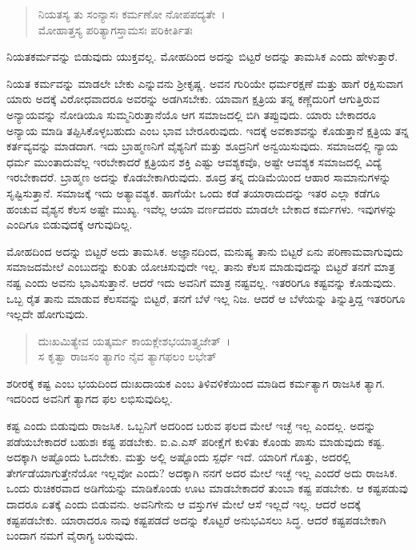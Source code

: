 \begin{verse}
ನಿಯತಸ್ಯ ತು ಸಂನ್ಯಾಸಃ ಕರ್ಮಣೋ ನೋಪಪದ್ಯತೇ~।\\ಮೋಹಾತ್ತಸ್ಯ ಪರಿತ್ಯಾಗಸ್ತಾಮಸಃ ಪರಿಕೀರ್ತಿತಃ 
\end{verse}

{\small ನಿಯತಕರ್ಮವನ್ನು ಬಿಡುವುದು ಯುಕ್ತವಲ್ಲ. ಮೋಹದಿಂದ ಅದನ್ನು ಬಿಟ್ಟರೆ ಅದನ್ನು ತಾಮಸಿಕ ಎಂದು ಹೇಳುತ್ತಾರೆ.}

ನಿಯತ ಕರ್ಮವನ್ನು ಮಾಡಲೇ ಬೇಕು ಎನ್ನುವನು ಶ‍್ರೀಕೃಷ್ಣ. ಅವನ ಗುರಿಯೇ ಧರ್ಮರಕ್ಷಣೆ ಮತ್ತು ಹಾಗೆ ರಕ್ಷಿಸುವಾಗ ಯಾರು ಅದಕ್ಕೆ ವಿರೋಧವಾದರೂ ಅವರನ್ನು ಅಡಗಿಸಬೇಕು. ಯಾವಾಗ ಕ್ಷತ್ರಿಯ ತನ್ನ ಕಣ್ಣೆದುರಿಗೆ ಆಗುತ್ತಿರುವ ಅನ್ಯಾಯವನ್ನು ನೋಡಿಯೂ ಸುಮ್ಮನಿರುತ್ತಾನೆಯೊ ಆಗ ಸಮಾಜದಲ್ಲಿ ಬಿಗಿ ತಪ್ಪುವುದು. ಯಾರು ಬೇಕಾದರೂ ಅನ್ಯಾಯ ಮಾಡಿ ತಪ್ಪಿಸಿಕೊಳ್ಳಬಹುದು ಎಂಬ ಭಾವ ಬೇರೂರುವುದು. ಇದಕ್ಕೆ ಅವಕಾಶವನ್ನು ಕೊಡುತ್ತಾನೆ ಕ್ಷತ್ರಿಯ ತನ್ನ ಕರ್ತವ್ಯವನ್ನು ಮಾಡದಾಗ. ಇದು ಬ್ರಾಹ್ಮಣನಿಗೆ ವೈಶ್ಯನಿಗೆ ಮತ್ತು ಶೂದ್ರನಿಗೆ ಅನ್ವಯಿಸುವುದು. ಸಮಾಜದಲ್ಲಿ ನ್ಯಾಯ ಧರ್ಮ ಮುಂತಾದುವೆಲ್ಲ ಇರಬೇಕಾದರೆ ಕ್ಷತ್ರಿಯನ ಶಕ್ತಿ ಎಷ್ಟು ಆವಶ್ಯಕವೊ, ಅಷ್ಟೇ ಆವಶ್ಯಕ ಸಮಾಜದಲ್ಲಿ ವಿದ್ಯೆ ಇರಬೇಕಾದರೆ. ಬ್ರಾಹ್ಮಣ ಅದನ್ನು ಕೊಡಬೇಕಾಗಿರುವುದು. ಶೂದ್ರ ತನ್ನ ದುಡಿಮೆಯಿಂದ ಆಹಾರ ಸಾಮಾನುಗಳನ್ನು ಸೃಷ್ಟಿಸುತ್ತಾನೆ. ಸಮಾಜಕ್ಕೆ ಇದು ಅತ್ಯಾವಶ್ಯಕ. ಹಾಗೆಯೇ ಒಂದು ಕಡೆ ತಯಾರಾದುದನ್ನು ಇತರ ಎಲ್ಲಾ ಕಡೆಗೂ ಹಂಚುವ ವೈಶ್ಯನ ಕೆಲಸ ಅಷ್ಟೇ ಮುಖ್ಯ. ಇವೆಲ್ಲ ಆಯಾ ವರ್ಣದವರು ಮಾಡಲೇ ಬೇಕಾದ ಕರ್ಮಗಳು. ಇವುಗಳನ್ನು ಎಂದಿಗೂ ಬಿಡುವುದಕ್ಕೆ ಆಗುವುದಿಲ್ಲ.

ಮೋಹದಿಂದ ಅದನ್ನು ಬಿಟ್ಟರೆ ಅದು ತಾಮಸಿಕ. ಅಜ್ಞಾನದಿಂದ, ಮನುಷ್ಯ ತಾನು ಬಿಟ್ಟರೆ ಏನು ಪರಿಣಾಮವಾಗುವುದು ಸಮಾಜದಮೇಲೆ ಎಂಬುದನ್ನು ಕುರಿತು ಯೋಚಿಸುವುದೇ ಇಲ್ಲ. ತಾನು ಕೆಲಸ ಮಾಡುವುದನ್ನು ಬಿಟ್ಟರೆ ತನಗೆ ಮಾತ್ರ ನಷ್ಟ ಎಂದು ಅವನು ಭಾವಿಸುತ್ತಾನೆ. ಆದರೆ ಇದು ಅವನಿಗೆ ಮಾತ್ರ ನಷ್ಟವಲ್ಲ. ಇತರರಿಗೂ ಕಷ್ಟವನ್ನು ಕೊಡುವುದು. ಒಬ್ಬ ರೈತ ತಾನು ಮಾಡುವ ಕೆಲಸವನ್ನು ಬಿಟ್ಟರೆ, ತನಗೆ ಬೆಳೆ ಇಲ್ಲ ನಿಜ. ಆದರೆ ಆ ಬೆಳೆಯನ್ನು ತಿನ್ನುತ್ತಿದ್ದ ಇತರರಿಗೂ ಇಲ್ಲದೇ ಹೋಗುವುದು.

\begin{verse}
ದುಃಖಮಿತ್ಯೇವ ಯತ್ಕರ್ಮ ಕಾಯಕ್ಲೇಶಭಯಾತ್ತ್ಯಜೇತ್~।\\ಸ ಕೃತ್ವಾ ರಾಜಸಂ ತ್ಯಾಗಂ ನೈವ ತ್ಯಾಗಫಲಂ ಲಭೇತ್ 
\end{verse}

{\small ಶರೀರಕ್ಕೆ ಕಷ್ಟ ಎಂಬ ಭಯದಿಂದ ದುಃಖದಾಯಕ ಎಂಬ ತಿಳಿವಳಿಕೆಯಿಂದ ಮಾಡಿದ ಕರ್ಮತ್ಯಾಗ ರಾಜಸಿಕ ತ್ಯಾಗ. ಇದರಿಂದ ಅವನಿಗೆ ತ್ಯಾಗದ ಫಲ ಲಭಿಸುವುದಿಲ್ಲ.}

ಕಷ್ಟ ಎಂದು ಬಿಡುವುದು ರಾಜಸಿಕ. ಒಬ್ಬನಿಗೆ ಅದರಿಂದ ಬರುವ ಫಲದ ಮೇಲೆ ಇಚ್ಛೆ ಇಲ್ಲ ಎಂದಲ್ಲ. ಅದನ್ನು ಪಡೆಯಬೇಕಾದರೆ ಬಹುಶಃ ಕಷ್ಟ ಪಡಬೇಕು. ಐ.ಎ.ಎಸ್ ಪರೀಕ್ಷೆಗೆ ಕುಳಿತು ಕೊಂಡು ಪಾಸು ಮಾಡುವುದು ಕಷ್ಟ. ಅದಕ್ಕಾಗಿ ಅಷ್ಟೊಂದು ಓದಬೇಕು. ಮತ್ತು ಅಲ್ಲಿ ಅಷ್ಟೊಂದು ಸ್ಪರ್ಧೆ ಇದೆ. ಯಾರಿಗೆ ಗೊತ್ತು, ಅದರಲ್ಲಿ ತೇರ್ಗಡೆಯಾಗುತ್ತೇನೆಯೋ ಇಲ್ಲವೋ ಎಂದು? ಅದಕ್ಕಾಗಿ ನನಗೆ ಅದರ ಮೇಲೆ ಇಚ್ಛೆ ಇಲ್ಲ ಎಂದರೆ ಅದು ರಾಜಸಿಕ. ಒಂದು ರುಚಿಕರವಾದ ಅಡಿಗೆಯನ್ನು ಮಾಡಿಕೊಂಡು ಊಟ ಮಾಡಬೇಕಾದರೆ ತುಂಬಾ ಕಷ್ಟ ಪಡಬೇಕು. ಆ ಕಷ್ಟಪಡುವು ದಾದರೂ ಏತಕ್ಕೆ ಎಂದು ಬಿಡುವನು. ಅವನಿಗೇನು ಆ ವಸ್ತುಗಳ ಮೇಲೆ ಆಸೆ ಇಲ್ಲದೆ ಇಲ್ಲ. ಆದರೆ ಅದಕ್ಕೆ ಕಷ್ಟಪಡಬೇಕು. ಯಾರಾದರೂ ನಾವು ಕಷ್ಟಪಡದೆ ಅದನ್ನು ಕೊಟ್ಟರೆ ಅನುಭವಿಸಲು ಸಿದ್ಧ. ಆದರೆ ಕಷ್ಟಪಡಬೇಕಾಗಿ ಬಂದಾಗ ನಮಗೆ ವೈರಾಗ್ಯ ಬರುವುದು.

